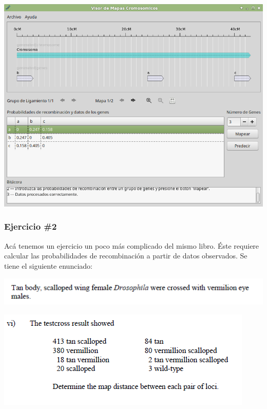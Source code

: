 \documentclass{article}
\begin{document}
	\begin{center}
		\includegraphics[scale=0.5]{images/e_3.png}
	\end{center}
	
	\subsubsection{Ejercicio \#2}
	
	Acá tenemos un ejercicio un poco más complicado del mismo libro. Éste requiere calcular las probabilidades de recombinación a partir de datos observados. Se tiene el siguiente enunciado:
	
	\begin{center}
		\includegraphics[scale=0.8]{images/e_4.png}
	\end{center}
	
	\begin{center}
		\includegraphics[scale=0.8]{images/e_5.png}
	\end{center}
	
\end{document}
